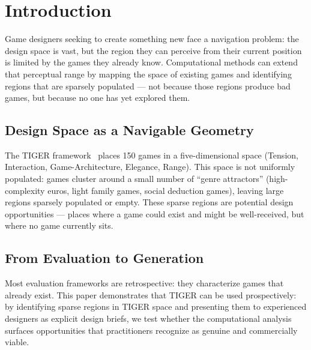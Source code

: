 \section{Introduction}
\label{sec:intro}

Game designers seeking to create something new face a navigation problem: the design
space is vast, but the region they can perceive from their current position is limited
by the games they already know. Computational methods can extend that perceptual range
by mapping the space of existing games and identifying regions that are sparsely
populated --- not because those regions produce bad games, but because no one has
yet explored them.

\subsection{Design Space as a Navigable Geometry}

The TIGER framework~\cite{dellaLibera2026framework} places 150 games in a
five-dimensional space (Tension, Interaction, Game-Architecture, Elegance, Range).
This space is not uniformly populated: games cluster around a small number of
``genre attractors'' (high-complexity euros, light family games, social deduction
games), leaving large regions sparsely populated or empty. These sparse regions
are potential design opportunities --- places where a game could exist and might be
well-received, but where no game currently sits.

\subsection{From Evaluation to Generation}

Most evaluation frameworks are retrospective: they characterize games that already
exist. This paper demonstrates that TIGER can be used prospectively: by identifying
sparse regions in TIGER space and presenting them to experienced designers as explicit
design briefs, we test whether the computational analysis surfaces opportunities that
practitioners recognize as genuine and commercially viable.
